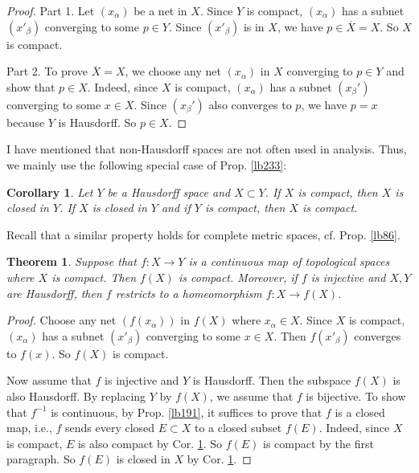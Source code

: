 \documentclass[12pt,b5paper,notitlepage]{article}
\theoremstyle{definition}
\theoremstyle{plain}
\newtheorem{thm}[df]{Theorem}
\newtheorem{co}[df]{Corollary}
\newcommand{\ovl}{\overline}
\numberwithin{equation}{section}
\begin{document}
\begin{proof}
Part 1. Let $(x_\alpha)$ be a net in $X$. Since $Y$ is compact, $(x_\alpha)$ has a subnet $(x'_\beta)$ converging to some $p\in Y$. Since $(x'_\beta)$ is in $X$, we have $p\in \ovl X=X$. So $X$ is compact.

Part 2. To prove $\ovl X=X$, we choose any net $(x_\alpha)$ in $X$ converging to $p\in Y$ and show that $p\in X$. Indeed, since $X$ is compact, $(x_\alpha)$ has a subnet $(x_\beta')$ converging to some $x\in X$. Since $(x_\beta')$ also converges to $p$, we have $p=x$ because $Y$ is Hausdorff. So $p\in X$.
\end{proof}

I have mentioned that non-Hausdorff spaces are not often used in analysis. Thus, we mainly use the following special case of Prop. \ref{lb233}:


\begin{co}\label{lb234}
Let $Y$ be a Hausdorff space and $X\subset Y$. If $X$ is compact, then $X$ is closed in $Y$. If $X$ is closed in $Y$ and if $Y$ is compact, then $X$ is compact.
\end{co}

Recall that a similar property holds for complete metric spaces, cf. Prop. \ref{lb86}.







\begin{thm}\label{lb236}
Suppose that $f:X\rightarrow Y$ is a continuous map of topological spaces where $X$ is compact. Then $f(X)$ is compact. Moreover, if $f$ is injective and $X,Y$ are Hausdorff, then $f$ restricts to a homeomorphism $f:X\rightarrow f(X)$.
\end{thm}

\begin{proof}
Choose any net $(f(x_\alpha))$ in $f(X)$ where $x_\alpha\in X$. Since $X$ is compact, $(x_\alpha)$ has a subnet $(x'_\beta)$ converging to some $x\in X$. Then $f(x'_\beta)$ converges to $f(x)$. So $f(X)$ is compact.

Now assume that $f$ is injective and $Y$ is Hausdorff. Then the subspace $f(X)$ is also Hausdorff. By replacing $Y$ by $f(X)$, we assume that $f$ is bijective. To show that $f^{-1}$ is continuous, by Prop. \ref{lb191}, it suffices to prove that $f$ is a closed map, i.e., $f$ sends every closed $E\subset X$ to a closed subset $f(E)$. Indeed, since $X$ is compact, $E$ is also compact by Cor. \ref{lb234}. So $f(E)$ is compact by the first paragraph. So $f(E)$ is closed in $X$ by Cor. \ref{lb234}.
\end{proof}
\end{document}
